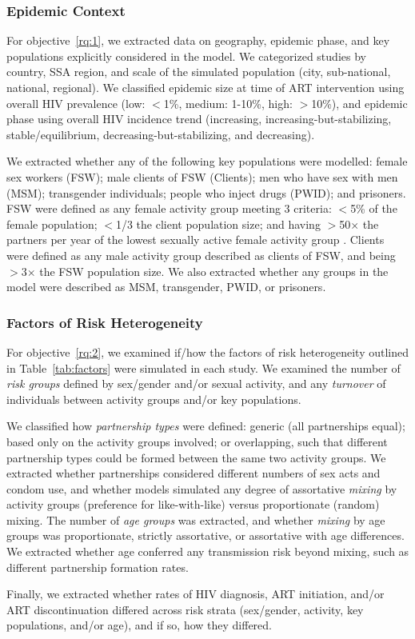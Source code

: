 \subsubsection{Epidemic Context}
\label{sss:meth:context}
For objective~\ref{rq:1}, we extracted data on
geography, epidemic phase, and key populations explicitly considered in the model.
We categorized studies by country, SSA region, and
scale of the simulated population (city, sub-national, national, regional).
We classified epidemic size at time of ART intervention using
overall HIV prevalence (low: $<$1\%, medium: 1-10\%, high: $>$10\%),
and epidemic phase using overall HIV incidence trend
(increasing, increasing-but-stabilizing, stable/equilibrium, decreasing-but-stabilizing, and decreasing).
\par
We extracted whether any of the following key populations were modelled:
female sex workers (FSW);
male clients of FSW (Clients);
men who have sex with men (MSM);
transgender individuals;
people who inject drugs (PWID); and
prisoners.
FSW were defined as any female activity group meeting 3 criteria:
{$<$5\%} of the female population;
{$<$1/3} the client population size; and
having {$>$50$\times$} the partners per year of
the lowest sexually active female activity group \cite{Vandepitte2006,Scorgie2012}.
Clients were defined as any male activity group
described as clients of FSW, and being {$>$3$\times$} the FSW population size.
We also extracted whether any groups in the model were described as MSM, transgender, PWID, or prisoners.
\subsubsection{Factors of Risk Heterogeneity}
\label{sss:meth:factors}
For objective~\ref{rq:2}, we examined if/how
the factors of risk heterogeneity outlined in Table~\ref{tab:factors}
were simulated in each study.
We examined the number of \emph{risk groups} defined by sex/gender and/or sexual activity, and
any \emph{turnover} of individuals between activity groups and/or key populations.
\par
We classified how \emph{partnership types} were defined:
generic (all partnerships equal);
based only on the activity groups involved;
or overlapping, such that different partnership types could be formed between the same two activity groups.
We extracted whether partnerships considered different
numbers of sex acts and condom use,
and whether models simulated any degree of assortative \emph{mixing} by activity groups
(preference for like-with-like) versus proportionate (random) mixing.
The number of \emph{age groups} was extracted, and whether \emph{mixing} by age groups was
proportionate, strictly assortative, or assortative with age differences.
We extracted whether age conferred any transmission risk beyond mixing,
such as different partnership formation rates.
\par
Finally, we extracted whether rates of HIV diagnosis, ART initiation, and/or ART discontinuation
differed across risk strata (sex/gender, activity, key populations, and/or age),
and if so, how they differed.
